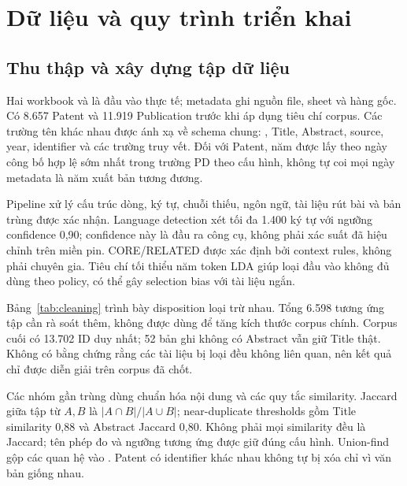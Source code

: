 \chapter{Dữ liệu và quy trình triển khai}\label{ch:implementation}
\section{Thu thập và xây dựng tập dữ liệu}
Hai workbook  và  là đầu vào thực tế; metadata ghi nguồn file, sheet và hàng gốc. Có 8.657 Patent và 11.919 Publication trước khi áp dụng tiêu chí corpus. Các trường tên khác nhau được ánh xạ về schema chung: , Title, Abstract, source, year, identifier và các trường truy vết. Đối với Patent, năm được lấy theo ngày công bố hợp lệ sớm nhất trong trường PD theo cấu hình, không tự coi mọi ngày metadata là năm xuất bản tương đương.

Pipeline xử lý cấu trúc dòng, ký tự, chuỗi thiếu, ngôn ngữ, tài liệu rút bài và bản trùng được xác nhận. Language detection xét tối đa 1.400 ký tự với ngưỡng confidence 0,90; confidence này là đầu ra công cụ, không phải xác suất đã hiệu chỉnh trên miền pin. CORE/RELATED được xác định bởi context rules, không phải chuyên gia. Tiêu chí tối thiểu năm token LDA giúp loại đầu vào không đủ dùng theo policy, có thể gây selection bias với tài liệu ngắn.


Bảng~\ref{tab:cleaning} trình bày disposition loại trừ nhau. Tổng 6.598  tương ứng tập cần rà soát thêm, không được dùng để tăng kích thước corpus chính. Corpus cuối có 13.702 ID duy nhất; 52 bản ghi không có Abstract vẫn giữ Title thật. Không có bằng chứng rằng các tài liệu bị loại đều không liên quan, nên kết quả chỉ được diễn giải trên corpus đã chốt.


Các nhóm gần trùng dùng chuẩn hóa nội dung và các quy tắc similarity. Jaccard giữa tập từ $A,B$ là $|A\cap B|/|A\cup B|$; near-duplicate thresholds gồm Title similarity 0,88 và Abstract Jaccard 0,80. Không phải mọi similarity đều là Jaccard; tên phép đo và ngưỡng tương ứng được giữ đúng cấu hình. Union-find gộp các quan hệ vào . Patent có identifier khác nhau không tự bị xóa chỉ vì văn bản giống nhau.


